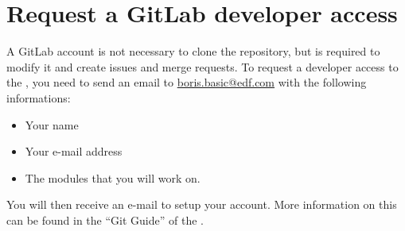 \section{Request a GitLab developer access}
%
A GitLab account is not necessary to clone the repository, but is required to
modify it and create issues and merge requests. To request a developer access
to the \telemacsystem, you need to send an email to \url{boris.basic@edf.com}
with the following informations:
\begin{itemize}
\item Your name
\item Your e-mail address
\item The \telemacsystem modules that you will work on.
\end{itemize}

You will then receive an e-mail to setup your account. More information on this
can be found in the ``Git Guide'' of the \telemacsystem.